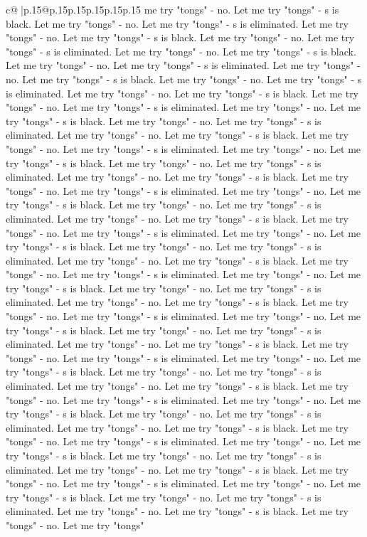 \documentclass{article}
\begin{document}
{\begin{supertabular}{c@{$\;$}|p{.15\linewidth}@{}p{.15\linewidth}p{.15\linewidth}p{.15\linewidth}p{.15\linewidth}p{.15\linewidth}}
{{{me try "tongs" {-} no. Let me try "tongs" {-} s is black. Let me try "tongs" {-} no. Let me try "tongs" {-} s is eliminated. Let me try "tongs" {-} no. Let me try "tongs" {-} s is black. Let me try "tongs" {-} no. Let me try "tongs" {-} s is eliminated. Let me try "tongs" {-} no. Let me try "tongs" {-} s is black. Let me try "tongs" {-} no. Let me try "tongs" {-} s is eliminated. Let me try "tongs" {-} no. Let me try "tongs" {-} s is black. Let me try "tongs" {-} no. Let me try "tongs" {-} s is eliminated. Let me try "tongs" {-} no. Let me try "tongs" {-} s is black. Let me try "tongs" {-} no. Let me try "tongs" {-} s is eliminated. Let me try "tongs" {-} no. Let me try "tongs" {-} s is black. Let me try "tongs" {-} no. Let me try "tongs" {-} s is eliminated. Let me try "tongs" {-} no. Let me try "tongs" {-} s is black. Let me try "tongs" {-} no. Let me try "tongs" {-} s is eliminated. Let me try "tongs" {-} no. Let me try "tongs" {-} s is black. Let me try "tongs" {-} no. Let me try "tongs" {-} s is eliminated. Let me try "tongs" {-} no. Let me try "tongs" {-} s is black. Let me try "tongs" {-} no. Let me try "tongs" {-} s is eliminated. Let me try "tongs" {-} no. Let me try "tongs" {-} s is black. Let me try "tongs" {-} no. Let me try "tongs" {-} s is eliminated. Let me try "tongs" {-} no. Let me try "tongs" {-} s is black. Let me try "tongs" {-} no. Let me try "tongs" {-} s is eliminated. Let me try "tongs" {-} no. Let me try "tongs" {-} s is black. Let me try "tongs" {-} no. Let me try "tongs" {-} s is eliminated. Let me try "tongs" {-} no. Let me try "tongs" {-} s is black. Let me try "tongs" {-} no. Let me try "tongs" {-} s is eliminated. Let me try "tongs" {-} no. Let me try "tongs" {-} s is black. Let me try "tongs" {-} no. Let me try "tongs" {-} s is eliminated. Let me try "tongs" {-} no. Let me try "tongs" {-} s is black. Let me try "tongs" {-} no. Let me try "tongs" {-} s is eliminated. Let me try "tongs" {-} no. Let me try "tongs" {-} s is black. Let me try "tongs" {-} no. Let me try "tongs" {-} s is eliminated. Let me try "tongs" {-} no. Let me try "tongs" {-} s is black. Let me try "tongs" {-} no. Let me try "tongs" {-} s is eliminated. Let me try "tongs" {-} no. Let me try "tongs" {-} s is black. Let me try "tongs" {-} no. Let me try "tongs" {-} s is eliminated. Let me try "tongs" {-} no. Let me try "tongs" {-} s is black. Let me try "tongs" {-} no. Let me try "tongs" {-} s is eliminated. Let me try "tongs" {-} no. Let me try "tongs" {-} s is black. Let me try "tongs" {-} no. Let me try "tongs" {-} s is eliminated. Let me try "tongs" {-} no. Let me try "tongs" {-} s is black. Let me try "tongs" {-} no. Let me try "tongs" {-} s is eliminated. Let me try "tongs" {-} no. Let me try "tongs" {-} s is black. Let me try "tongs" {-} no. Let me try "tongs" {-} s is eliminated. Let me try "tongs" {-} no. Let me try "tongs" {-} s is black. Let me try "tongs" {-} no. Let me try "tongs" {-} s is eliminated. Let me try "tongs" {-} no. Let me try "tongs" {-} s is black. Let me try "tongs" {-} no. Let me try "tongs" {-} s is eliminated. Let me try "tongs" {-} no. Let me try "tongs" {-} s is black. Let me try "tongs" {-} no. Let me try "tongs" }}}
\end{supertabular}}
\end{document}
